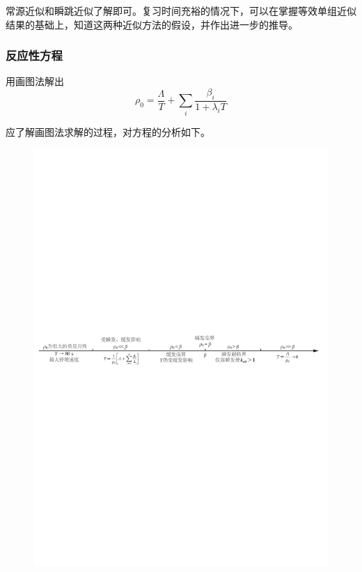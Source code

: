 常源近似和瞬跳近似了解即可。复习时间充裕的情况下，可以在掌握等效单组近似结果的基础上，知道这两种近似方法的假设，并作出进一步的推导。

\subsubsection{反应性方程}

用画图法解出
\begin{equation}
    \rho_0 = \frac{\varLambda}{T} + \sum_{i} \frac{\beta_i}{1+\lambda_i T}
\end{equation}

应了解画图法求解的过程，对方程的分析如下。

\begin{figure}[H]
    \centering
    \includegraphics[scale=0.7]{figures/figure4.1.pdf}
\end{figure}

